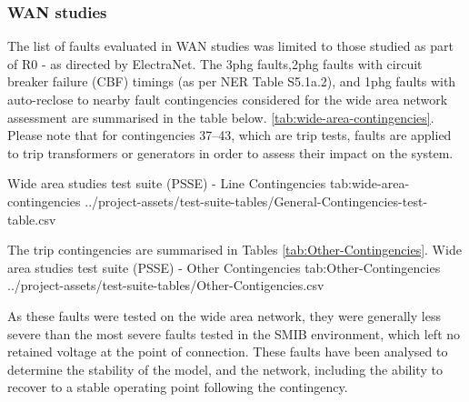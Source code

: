 \documentclass{../grid-link-report}
\newcommand{\projectassetsdir}{../project-assets}
\begin{document}
	
	
	\subsubsection{WAN studies}
	\label{subsubsec:WAN-results}
%	
	The list of faults evaluated in WAN studies was limited to those studied as part of R0 - as directed by ElectraNet. The 3phg faults,2phg faults with circuit breaker failure (CBF) timings (as per NER Table S5.1a.2), and 1phg faults with auto-reclose to nearby fault contingencies considered for the wide area network assessment are summarised in the table below. \ref{tab:wide-area-contingencies}. Please note that for contingencies 37–43, which are trip tests, faults are applied to trip transformers or generators in order to assess their impact on the system.

	
	{
		\fontsize{7}{9}\selectfont
		\autoscaledlongtable
		{Wide area studies test suite (PSSE) - Line Contingencies}
		{tab:wide-area-contingencies}
		{\projectassetsdir/test-suite-tables/General-Contingencies-test-table.csv}
	}
	
	The trip contingencies are summarised in Tables \ref{tab:Other-Contingencies}.
	{
		\fontsize{7}{9}\selectfont
		\autoscaledlongtable
		{Wide area studies test suite (PSSE) - Other Contingencies}
		{tab:Other-Contingencies}
		{\projectassetsdir/test-suite-tables/Other-Contigencies.csv}
	}

	
	As these faults were tested on the wide area network, they were generally less severe than the most severe faults tested in the SMIB environment, which left no retained voltage at the point of connection. These faults have been analysed to determine the stability of the model, and the network, including the ability to recover to a stable operating point following the contingency.
	
	
	
\end{document}

